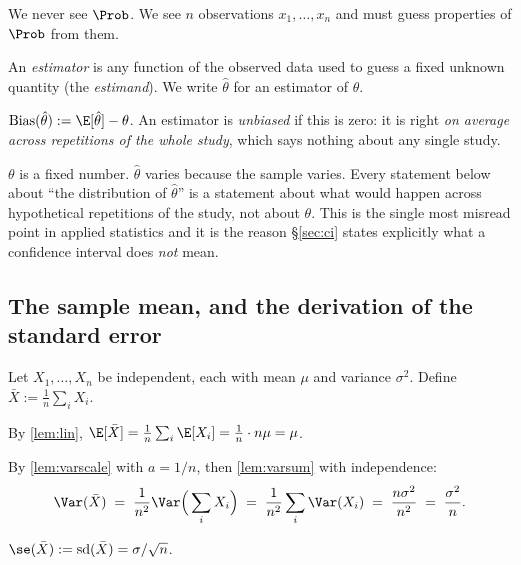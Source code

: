 We never see $\Prob$. We see $n$ observations $x_1,\dots,x_n$ and must guess
properties of $\Prob$ from them.

\begin{definition}[Estimator]
An \emph{estimator} is any function of the observed data used to guess a fixed
unknown quantity (the \emph{estimand}). We write $\hat\theta$ for an estimator of
$\theta$.
\end{definition}

\begin{definition}[Bias]
$\operatorname{Bias}(\hat\theta) := \E[\hat\theta] - \theta$. An estimator is
\emph{unbiased} if this is zero: it is right \emph{on average across repetitions
of the whole study}, which says nothing about any single study.
\end{definition}

\begin{remark}
$\theta$ is a fixed number. $\hat\theta$ varies because the sample varies. Every
statement below about ``the distribution of $\hat\theta$'' is a statement about
what would happen across hypothetical repetitions of the study, not about
$\theta$. This is the single most misread point in applied statistics and it is
the reason §\ref{sec:ci} states explicitly what a confidence interval does
\emph{not} mean.
\end{remark}

\subsection{The sample mean, and the derivation of the standard error}
\label{sec:se}

Let $X_1,\dots,X_n$ be independent, each with mean $\mu$ and variance $\sigma^2$.
Define $\bar X := \frac1n\sum_i X_i$.

By \cref{lem:lin}, $\E[\bar X] = \frac1n\sum_i \E[X_i] = \frac1n \cdot n\mu = \mu$.

By \cref{lem:varscale} with $a = 1/n$, then \cref{lem:varsum} with independence:
\begin{equation}
\Var(\bar X) \;=\; \frac{1}{n^2}\Var\Big(\sum_i X_i\Big)
  \;=\; \frac{1}{n^2}\sum_i \Var(X_i)
  \;=\; \frac{n\sigma^2}{n^2}
  \;=\; \frac{\sigma^2}{n}.
\label{eq:varmean}
\end{equation}

\begin{definition}
$\se(\bar X) := \operatorname{sd}(\bar X) = \sigma/\sqrt{n}$.
\end{definition}

